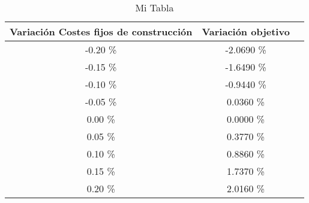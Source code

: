 \begin{table}
\centering
\begin{tabular}{|c|c|c|}
\hline
 Variación Costes fijos de construcción & Variación objetivo \\ \hline
-0.20 \% & -2.0690 \% \\ \hline
-0.15 \% & -1.6490 \% \\ \hline
-0.10 \% & -0.9440 \% \\ \hline
-0.05 \% & 0.0360 \% \\ \hline
0.00 \% & 0.0000 \% \\ \hline
0.05 \% & 0.3770 \% \\ \hline
0.10 \% & 0.8860 \% \\ \hline
0.15 \% & 1.7370 \% \\ \hline
0.20 \% & 2.0160 \% \\ \hline
\end{tabular}
\caption{Mi Tabla}
\end{table}
